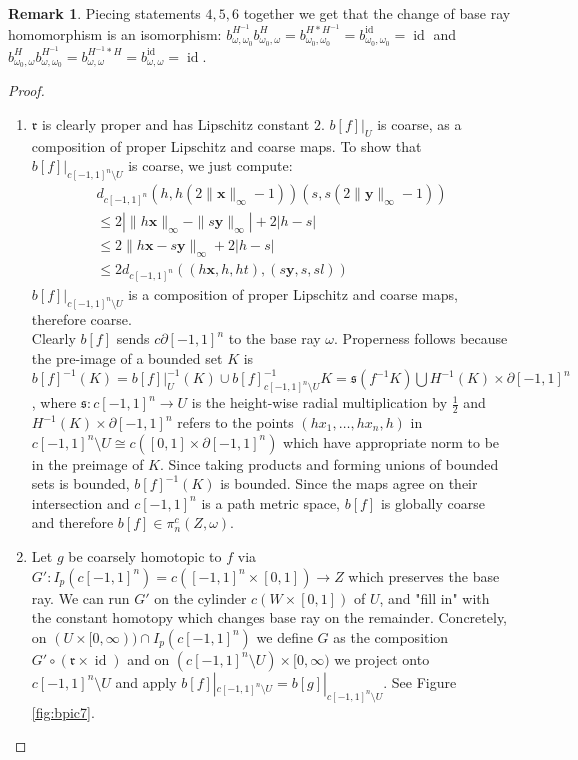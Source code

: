 \documentclass[a4paper,11pt]{article}
\theoremstyle{definition}
\newtheorem*{remark}{Remark}
\theoremstyle{plain}
\theoremstyle{remark}
\DeclareMathOperator{\id}{id}
\begin{document}
\begin{remark} Piecing statements $4,5,6$ together we get that the change of base ray homomorphism is an isomorphism: $b_{\omega,\omega_0}^{H^{-1}}b_{\omega_0,\omega}^{H}= b_{\omega_0,\omega_0}^{H\ast H^{-1}}=b_{\omega_0,\omega_0}^{\id}= \id$ and $b_{\omega_0,\omega}^{H}b_{\omega,\omega_0}^{H^{-1}} = b_{\omega,\omega}^{H^{-1}\ast H} = b_{\omega,\omega}^{\id}=  \id$. 
\end{remark}


\begin{proof} 
\begin{enumerate}
\item $\mathfrak{r}$ is clearly proper and has Lipschitz constant $2$. $b[f]|_{U}$ is coarse, as a composition of proper Lipschitz and coarse maps. To show that $b[f]|_{c[-1,1]^n\setminus U}$ is coarse, we just compute: 
 \begin{align*}
 d_{c[-1,1]^n}(h,h(2\|\mathbf{x}\|_{\infty}-1))(s, s(2\|\mathbf{y}\|_{\infty}-1)) \\
 \leq 2|\|h\mathbf{x}\|_{\infty}-\|s\mathbf{y}\|_{\infty}|+2|h-s|\\
 \leq 2\|h\mathbf{x}-s\mathbf{y}\|_{\infty}+2|h-s| \\
 \leq 2 d_{c[-1,1]^n}((h\mathbf{x}, h,ht),(s\mathbf{y} ,s,sl))
 \end{align*} 
 $b[f]|_{c[-1,1]^n\setminus U}$ is a composition of proper Lipschitz and coarse maps, therefore coarse. \\
 
 Clearly $b[f]$ sends $c\partial[-1,1]^n$ to the base ray $\omega$. Properness follows because the pre-image of a bounded set $K$ is $b[f]^{-1}(K)=  b[f]|_{U}^{-1}(K) \cup b[f]_{c[-1,1]^n\setminus U}^{-1}{K} = \mathfrak{s}(f^{-1}{K})\bigcup H^{-1}(K)\times \partial[-1,1]^n$, where $\mathfrak{s}: c[-1,1]^n \rightarrow U$ is the height-wise radial multiplication by $\frac{1}{2}$ and $H^{-1}(K)\times \partial[-1,1]^n$ refers to the points $(hx_1,\dots,hx_n,h)$ in $c[-1,1]^n\setminus U \cong c([0,1] \times \partial [-1,1]^n)$ which have appropriate norm to be in the preimage of $K$. Since taking products and forming unions of bounded sets is bounded, $b[f]^{-1}{(K)}$ is bounded. Since the maps agree on their intersection and $c[-1,1]^n$ is a path metric space, $b[f]$ is globally coarse and therefore $b[f]\in \pi_{n}^{c}(Z,\omega)$.\\
\item Let $g$ be coarsely homotopic to $f$ via $G':I_{p}(c[-1,1]^n) = c([-1,1]^n \times [0,1])\rightarrow Z$ which preserves the base ray. We can run $G'$ on the cylinder $c(W \times [0,1])$ of $U$, and "fill in" with the constant homotopy which changes base ray on the remainder. Concretely, on $(U\times [0,\infty)) \cap I_{p}(c[-1,1]^n)$ we define $G$ as the composition $G' \circ (\mathfrak{r} \times \id)$ and on $(c[-1,1]^n \setminus U) \times [0,\infty)$ we project onto $c[-1,1]^n \setminus U$ and apply $b[f]|_{c[-1,1]^n\setminus U} =b[g]|_{c[-1,1]^n\setminus U}$. See Figure \ref{fig:bpic7}. 


\end{enumerate}
\end{proof}
\end{document}
